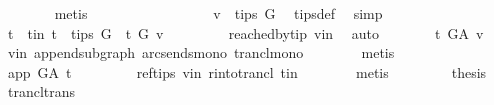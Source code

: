 \begin{isabellebody}
\ \ \ \ \ \ \isamarkupfalse%
\ {\isacharparenleft}{\kern0pt}metis{\isacharparenright}{\kern0pt}\ \isanewline
\ \ \isamarkupfalse%
\isanewline
\ \ \ \ \isamarkupfalse%
\ {}\isanewline
\ \ \ \ \isamarkupfalse%
\ \isamarkupfalse%
\ {\isachardoublequoteopen}v\ {\isasymnotin}\ tips\ G{\isachardoublequoteclose}\ \isamarkupfalse%
\ tips{\isacharunderscore}{\kern0pt}def\ \isamarkupfalse%
\ simp\isanewline
\ \ \ \ \isamarkupfalse%
\ \isamarkupfalse%
\ t\ \ t{\isacharunderscore}{\kern0pt}in{\isacharcolon}{\kern0pt}\ {\isachardoublequoteopen}t\ {\isasymin}\ tips\ G\ {\isasymand}\ t\ {\isasymrightarrow}\isactrlsup {\isacharplus}{\kern0pt}\isactrlbsub G\isactrlesub \ v{\isachardoublequoteclose}\ \isanewline
\ \ \ \ \ \ \isamarkupfalse%
\ reached{\isacharunderscore}{\kern0pt}by{\isacharunderscore}{\kern0pt}tip\ v{\isacharunderscore}{\kern0pt}in\ \isamarkupfalse%
\ auto\isanewline
\ \ \ \ \isamarkupfalse%
\ \isamarkupfalse%
\ {\isachardoublequoteopen}t\ {\isasymrightarrow}\isactrlsup {\isacharplus}{\kern0pt}\isactrlbsub G{\isacharunderscore}{\kern0pt}A\isactrlesub \ v{\isachardoublequoteclose}\ \isamarkupfalse%
\ v{\isacharunderscore}{\kern0pt}in\ append{\isacharunderscore}{\kern0pt}subgraph\ arcs{\isacharunderscore}{\kern0pt}ends{\isacharunderscore}{\kern0pt}mono\ trancl{\isacharunderscore}{\kern0pt}mono\isanewline
\ \ \ \ \ \ \isamarkupfalse%
\ {\isacharparenleft}{\kern0pt}metis{\isacharparenright}{\kern0pt}\isanewline
\ \ \ \ \isamarkupfalse%
\ \isamarkupfalse%
\ {\isachardoublequoteopen}app\ {\isasymrightarrow}\isactrlsup {\isacharplus}{\kern0pt}\isactrlbsub G{\isacharunderscore}{\kern0pt}A\isactrlesub \ t{\isachardoublequoteclose}\ \isanewline
\ \ \ \ \ \ \isamarkupfalse%
\ ref{\isacharunderscore}{\kern0pt}tips\ v{\isacharunderscore}{\kern0pt}in\ r{\isacharunderscore}{\kern0pt}into{\isacharunderscore}{\kern0pt}trancl{\isacharprime}{\kern0pt}\ t{\isacharunderscore}{\kern0pt}in\isanewline
\ \ \ \ \ \ \isamarkupfalse%
\ {\isacharparenleft}{\kern0pt}metis{\isacharparenright}{\kern0pt}\ \isanewline
\ \ \ \ \isamarkupfalse%
\ \isamarkupfalse%
\ {\isacharquery}{\kern0pt}thesis\ \isamarkupfalse%
\ trancl{\isacharunderscore}{\kern0pt}trans\ \isamarkupfalse%

\end{isabellebody}
